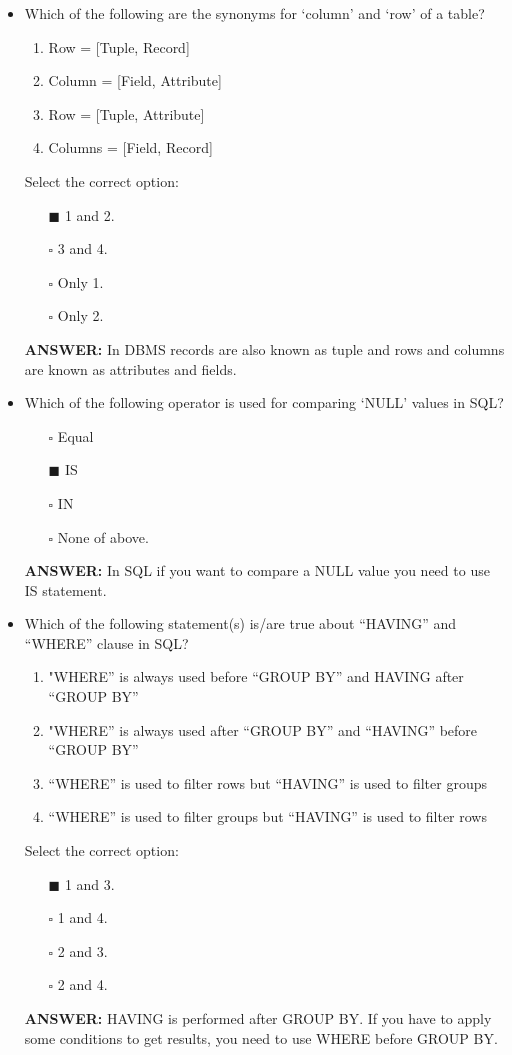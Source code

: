 \documentclass[10pt]{article}
\begin{document}
\begin{itemize}
		\item Which of the following are the synonyms for ‘column’ and ‘row’ of a table?
			\begin{enumerate}
				\item Row = [Tuple, Record]
				\item Column = [Field, Attribute]
				\item Row = [Tuple, Attribute]
				\item Columns = [Field, Record]
			\end{enumerate}
			Select the correct option:
			\begin{enumerate}
				\item[$\blacksquare$] 1 and 2.
				\item[$\square$] 3 and 4.
				\item[$\square$] Only 1.
				\item[$\square$] Only 2.
			\end{enumerate}
			\color{red} \textbf{ANSWER:} \color{black} In DBMS records are also known as tuple and rows and columns are known as attributes and fields.

		\item Which of the following operator is used for comparing ‘NULL’ values in SQL?
			\begin{enumerate}
				\item[$\square$] Equal
				\item[$\blacksquare$] IS
				\item[$\square$] IN
				\item[$\square$] None of above.
			\end{enumerate}
			\color{red} \textbf{ANSWER:} \color{black} In SQL if you want to compare a NULL value you need to use IS statement.

		\newpage

		\item Which of the following statement(s) is/are true about “HAVING” and “WHERE” clause in SQL?
			\begin{enumerate}
				\item "WHERE” is always used before “GROUP BY” and HAVING after “GROUP BY”
				\item "WHERE” is always used after “GROUP BY” and “HAVING” before “GROUP BY”
				\item “WHERE” is used to filter rows but “HAVING” is used to filter groups
				\item “WHERE” is used to filter groups but “HAVING” is used to filter rows
			\end{enumerate}
			Select the correct option:
			\begin{enumerate}
				\item[$\blacksquare$] 1 and 3.
				\item[$\square$] 1 and 4.
				\item[$\square$] 2 and 3.
				\item[$\square$] 2 and 4.
			\end{enumerate}
			\color{red} \textbf{ANSWER:} \color{black} HAVING is performed after GROUP BY. If you have to apply some conditions to get results, you need to use WHERE before GROUP BY.


\end{itemize}
\end{document}

